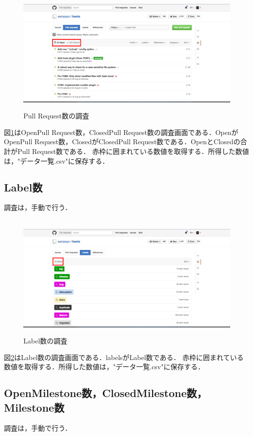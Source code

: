 \begin{figure}[H]
\centering　
\includegraphics[width=13cm]{PullRequest.png}
\caption{Pull Request数の調査}\label{tab:PullRequest}
\end{figure}

図\ref{tab:PullRequest}はOpenPull Request数，ClosedPull Request数の調査画面である．OpenがOpenPull Request数，ClosedがClosedPull Request数である．OpenとClosedの合計がPull Request数である．
赤枠に囲まれている数値を取得する．所得した数値は，"データ一覧.csv"に保存する．

\subsection{Label数}
調査は，手動で行う．

\begin{figure}[H]
\centering　
\includegraphics[width=13cm]{Label.png}
\caption{Label数の調査}\label{tab:Label}
\end{figure}

図\ref{tab:Label}はLabel数の調査画面である．labelsがLabel数である．
赤枠に囲まれている数値を取得する．所得した数値は，"データ一覧.csv"に保存する．


\subsection{OpenMilestone数，ClosedMilestone数，Milestone数}
調査は，手動で行う．



